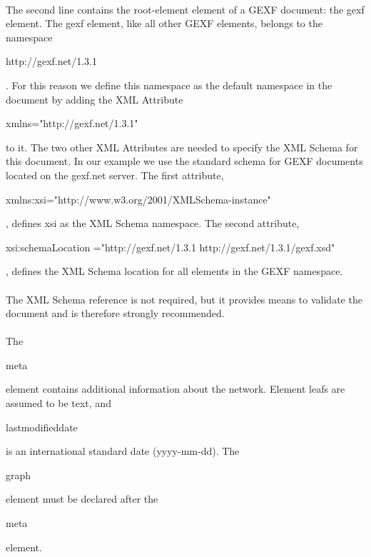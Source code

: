 \documentclass[a4paper,10pt]{article}
\begin{document}
\paragraph{}
The second line contains the root-element element of a GEXF document: the gexf element. The gexf element, like all other GEXF elements, belongs to the namespace \begin{footnotesize}http://gexf.net/1.3.1\end{footnotesize}. For this reason we define this namespace as the default namespace in the document by adding the XML Attribute \begin{footnotesize}xmlns="http://gexf.net/1.3.1"\end{footnotesize} to it. The two other XML Attributes are needed to specify the XML Schema for this document. In our example we use the standard schema for GEXF documents located on the gexf.net server. The first attribute, \begin{footnotesize}xmlns:xsi="http://www.w3.org/2001/XMLSchema-instance"\end{footnotesize}, defines xsi as the XML Schema namespace. The second attribute, \begin{footnotesize}xsi:schemaLocation ="http://gexf.net/1.3.1 http://gexf.net/1.3.1/gexf.xsd"\end{footnotesize}, defines the XML Schema location for all elements in the GEXF namespace.

\paragraph{}
The XML Schema reference is not required, but it provides means to validate the document and is therefore strongly recommended.

\paragraph{}
The \begin{footnotesize}meta\end{footnotesize} element contains additional information about the network. Element leafs are assumed to be text, and \begin{footnotesize}lastmodifieddate\end{footnotesize} is an international standard date (yyyy-mm-dd). The \begin{footnotesize}graph\end{footnotesize} element must be declared after the \begin{footnotesize}meta\end{footnotesize} element.
\end{document}
